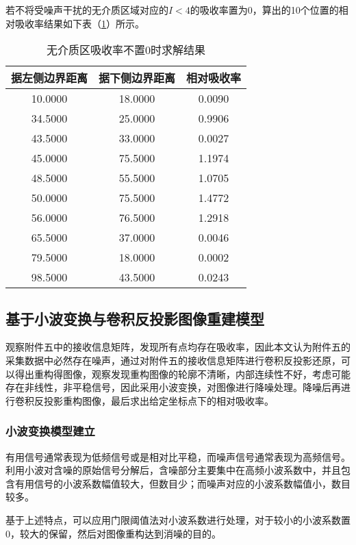 \documentclass[withoutpreface,bwprint]{cumcmthesis} %
\begin{document}
若不将受噪声干扰的无介质区域对应的$I<4$的吸收率置为0，算出的10个位置的相对吸收率结果如下表（\ref{q2无介质区吸收率不置0时求解结果}）所示。

\begin{table}[!h]
\centering
\renewcommand\arraystretch{0.6}
\caption{无介质区吸收率不置0时求解结果}
\label{q2无介质区吸收率不置0时求解结果}
\begin{tabular}{ccc}
\toprule
据左侧边界距离&据下侧边界距离&相对吸收率\\
\midrule
10.0000 &	18.0000 &0.0090\\
34.5000 &	25.0000 &0.9906\\
43.5000 &	33.0000 &0.0027\\
45.0000 &	75.5000 &1.1974\\
48.5000 &	55.5000 &1.0705\\
50.0000 &	75.5000 &1.4772\\
56.0000 &	76.5000 &1.2918\\
65.5000 &	37.0000 &0.0046\\
79.5000 &	18.0000 &0.0002\\
98.5000 &	43.5000 &0.0243\\
\bottomrule 
\end{tabular}
\end{table}
\newpage
\subsection{基于小波变换与卷积反投影图像重建模型}
\par 观察附件五中的接收信息矩阵，发现所有点均存在吸收率，因此本文认为附件五的采集数据中必然存在噪声，通过对附件五的接收信息矩阵进行卷积反投影还原，可以得出重构得图像，观察发现重构图像的轮廓不清晰，内部连续性不好，考虑可能存在非线性，非平稳信号，因此采用小波变换，对图像进行降噪处理。降噪后再进行卷积反投影重构图像，最后求出给定坐标点下的相对吸收率。
\subsubsection{小波变换模型建立}

\par 有用信号通常表现为低频信号或是相对比平稳，而噪声信号通常表现为高频信号。利用小波对含噪的原始信号分解后，含噪部分主要集中在高频小波系数中，并且包含有用信号的小波系数幅值较大，但数目少；而噪声对应的小波系数幅值小，数目较多。
\par 基于上述特点，可以应用门限阈值法对小波系数进行处理，对于较小的小波系数置0，较大的保留，然后对图像重构达到消噪的目的。
\end{document}
